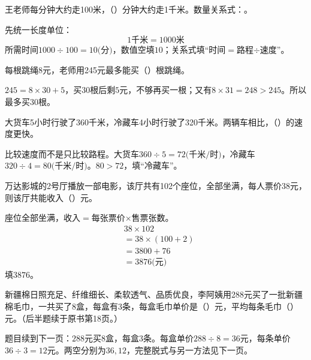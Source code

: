 王老师每分钟大约走100米，（\hspace{1.8em}）分钟大约走1千米。数量关系式：\BookBlank{}。\par
\begin{BookAnswer}
先统一长度单位：\[1\text{千米}=1000\text{米}\]所需时间\(1000\div100=10\text{(分)}\)，数值空填\(10\)；关系式填“时间\(=\)路程\(\div\)速度”。
\end{BookAnswer}

每根跳绳8元，老师用245元最多能买（\hspace{1.8em}）根跳绳。\par
\begin{BookAnswer}
\(245=8\times30+5\)，买\(30\)根后剩\(5\)元，不够再买一根；又有\(8\times31=248>245\)。所以最多买\(30\)根。
\end{BookAnswer}

大货车5小时行驶了360千米，冷藏车4小时行驶了320千米。两辆车相比，（\hspace{1.8em}）的速度更快。\par
\begin{BookAnswer}
比较速度而不是只比较路程。大货车\(360\div5=72\text{(千米/时)}\)，冷藏车\(320\div4=80\text{(千米/时)}\)。\(80>72\)，填“冷藏车”。
\end{BookAnswer}

万达影城的2号厅播放一部电影，该厅共有102个座位，全部坐满，每人票价38元，则该厅共能收入（\hspace{1.8em}）元。\par
\begin{BookAnswer}
座位全部坐满，收入\(=\)每张票价\(\times\)售票张数。\[\begin{aligned}&38\times102\\&=38\times(100+2)\\&=3800+76\\&=3876\text{(元)}\end{aligned}\]填\(3876\)。
\end{BookAnswer}

新疆棉日照充足、纤维细长、柔软透气、品质优良，李阿姨用288元买了一批新疆棉毛巾，一共买了8盒，每盒有3条，每盒毛巾单价是（\hspace{1.8em}）元，平均每条毛巾（\hspace{1.8em}）元。（后半题续于原书第18页。）\par
\begin{BookAnswer}
题目续到下一页：\(288\)元买\(8\)盒，每盒\(3\)条。每盒单价\(288\div8=36\)元，每条单价\(36\div3=12\)元。两空分别为\(36,12\)，完整脱式与另一方法见下一页。
\end{BookAnswer}

